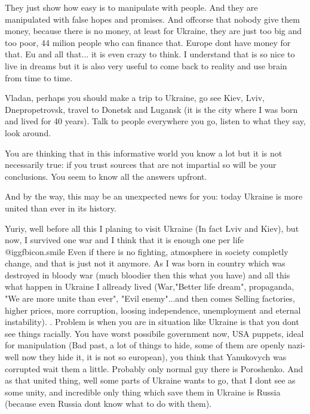 \begin{itemize}
\begin{itemize}

They just show how easy is to manipulate with people. And they are manipulated
with false hopes and promises. And offcorse that nobody give them money,
because there is no money, at least for Ukraine, they are just too big and too
poor, 44 milion people who can finance that. Europe dont have money for that.
Eu and all that... it is even crazy to think. I understand that is so nice to
live in dreams but it is also very useful to come back to reality and use brain
from time to time.


Vladan, perhaps you should make a trip to Ukraine, go see Kiev, Lviv,
Dnepropetrovsk, travel to Donetsk and Lugansk (it is the city where I was born
and lived for 40 years). Talk to people everywhere you go, listen to what they
say, look around.

You are thinking that in this informative world you know a lot but it is not
necessarily true: if you trust sources that are not impartial so will be your
conclusions. You seem to know all the answers upfront.

And by the way, this may be an unexpected news for you: today Ukraine is more
united than ever in its history.


Yuriy, well before all this I planing to visit Ukraine (In fact Lviv and Kiev),
but now, I survived one war and I think that it is enough one per life  @igg{fbicon.smile}  Even
if there is no fighting, atmosphere in society completly change, and that is
just not it anymore. As I was born in country which was destroyed in bloody war
(much bloodier then this what you have) and all this what happen in Ukraine I
allready lived (War,"Better life dream", propaganda, "We are more unite than
ever", "Evil enemy"...and then comes Selling factories, higher prices, more
corruption, loosing independence, unemployment and eternal instability). .
Problem is when you are in situation like Ukraine is that you dont see things
racially. You have worst possibile government now, USA puppets, ideal for
manipulation (Bad past, a lot of things to hide, some of them are openly
nazi-well now they hide it, it is not so european), you think that Yanukovych
was corrupted wait them a little. Probably only normal guy there is Poroshenko.
And as that united thing, well some parts of Ukraine wants to go, that I dont
see as some unity, and incredible only thing which save them in Ukraine is
Russia (because even Russia dont know what to do with them).


\end{itemize}
\end{itemize}
